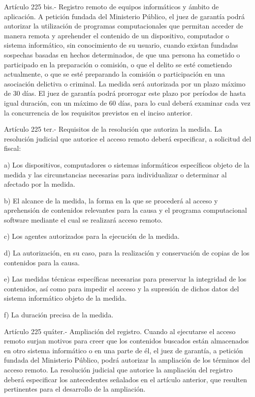     Artículo 225 bis.- Registro remoto de equipos informáticos y ámbito de aplicación. A petición fundada del Ministerio Público, el juez de garantía podrá autorizar la utilización de programas computacionales que permitan acceder de manera remota y aprehender el contenido de un dispositivo, computador o sistema informático, sin conocimiento de su usuario, cuando existan fundadas sospechas basadas en hechos determinados, de que una persona ha cometido o participado en la preparación o comisión, o que el delito se esté cometiendo actualmente, o que se esté preparando la comisión o participación en una asociación delictiva o criminal.
    La medida será autorizada por un plazo máximo de 30 días. El juez de garantía podrá prorrogar este plazo por períodos de hasta igual duración, con un máximo de 60 días, para lo cual deberá examinar cada vez la concurrencia de los requisitos previstos en el inciso anterior.


    Artículo 225 ter.- Requisitos de la resolución que autoriza la medida. La resolución judicial que autorice el acceso remoto deberá especificar, a solicitud del fiscal:

    a) Los dispositivos, computadores o sistemas informáticos específicos objeto de la medida y las circunstancias necesarias para individualizar o determinar al afectado por la medida.

    b) El alcance de la medida, la forma en la que se procederá al acceso y aprehensión de contenidos relevantes para la causa y el programa computacional software mediante el cual se realizará acceso remoto.

    c) Los agentes autorizados para la ejecución de la medida.

    d) La autorización, en su caso, para la realización y conservación de copias de los contenidos para la causa.

    e) Las medidas técnicas específicas necesarias para preservar la integridad de los contenidos, así como para impedir el acceso y la supresión de dichos datos del sistema informático objeto de la medida.

    f) La duración precisa de la medida.


    Artículo 225 quáter.- Ampliación del registro. Cuando al ejecutarse el acceso remoto surjan motivos para creer que los contenidos buscados están almacenados en otro sistema informático o en una parte de él, el juez de garantía, a petición fundada del Ministerio Público, podrá autorizar la ampliación de los términos del acceso remoto.
    La resolución judicial que autorice la ampliación del registro deberá especificar los antecedentes señalados en el artículo anterior, que resulten pertinentes para el desarrollo de la ampliación.


